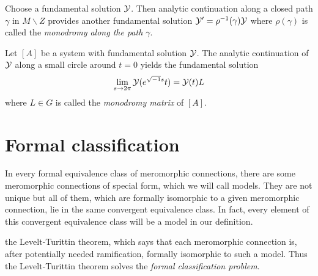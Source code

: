 Choose a fundamental solution $\mathcal{Y}$. Then analytic continuation along a closed
path $\gamma$ in $M\backslash Z$ provides another fundamental solution
$\mathcal{Y}'=\rho^{-1}(\gamma)\mathcal{Y}$ where $\rho(\gamma)$ is called the \emph{monodromy
along the path $\gamma$}.
\begin{defn}
  Let $[A]$ be a system with fundamental solution $\mathcal{Y}$.
  The analytic continuation of $\mathcal{Y}$ along a small circle around $t=0$ yields
  the fundamental solution
  \[
    \lim_{s\to2\pi}\mathcal{Y}(e^{\sqrt{-1}s}t)=\mathcal{Y}(t)L
  \]
  where $L\in G$ is called the \emph{\TODO[(formal)?]monodromy matrix} of $[A]$.
\end{defn}

 

\section{Formal classification}\label{sec:formalClassification}
In every formal equivalence class of meromorphic connections, there are some
meromorphic connections of special form, which we will call models. They are
not unique but all of them, which are formally isomorphic to a given
meromorphic connection, lie in the same convergent equivalence class.
In fact, every element of this convergent equivalence class will be a model in
our definition.

 the Levelt-Turittin theorem, which says
that each meromorphic connection is, after potentially needed ramification,
formally isomorphic to such a model.
Thus the Levelt-Turittin theorem solves the \emph{formal classification
problem}.

